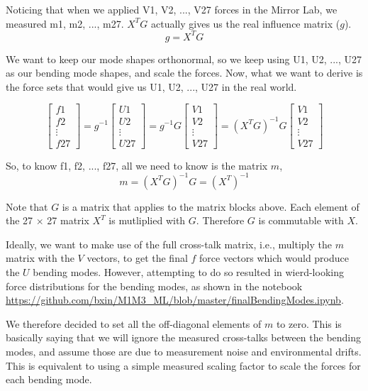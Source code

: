 \documentclass [twoside,openbib,12pt]{article}
\newcommand{\beq}{\begin{equation}}
\newcommand{\eeq}{\end{equation}}
\begin{document}
Noticing that when we applied V1, V2, ..., V27 forces in the Mirror Lab, we measured m1, m2, ..., m27. $X^T G$ actually gives us the real influence matrix ($g$).
\beq
g = X^T G
\eeq

We want to keep our mode shapes orthonormal, so we keep
using U1, U2, ..., U27 as our bending mode shapes,
and scale the forces.
Now, what we want to derive is the force sets that would give us U1, U2, ..., U27 in the real world.

\beq
\left[ \begin{array}{c} f1  \\ f2 \\ \vdots \\ f27 \end{array} \right]
= g^{-1}
\left[ \begin{array}{c} U1  \\ U2 \\ \vdots \\ U27 \end{array} \right]
= g^{-1} G
\left[ \begin{array}{c} V1  \\ V2 \\ \vdots \\ V27 \end{array} \right]
= (X^T G)^{-1} G
\left[ \begin{array}{c} V1  \\ V2 \\ \vdots \\ V27 \end{array} \right]
\eeq

So, to know f1, f2, ..., f27, all we need to know is the matrix $m$,
\beq
m = (X^T G)^{-1} G = (X^T)^{-1} 
\eeq

Note that $G$ is a matrix that applies to the matrix blocks
above. Each element of the 27 $\times$ 27 matrix $X^T$ is mutliplied with
$G$. Therefore $G$ is commutable with $X$.

Ideally, we want to make use of the full cross-talk matrix, i.e.,
multiply the $m$ matrix with the $V$ vectors, to get the final $f$
force vectors which would produce the $U$ bending modes.
However, attempting to do so resulted in wierd-looking force
distributions for the bending modes, as shown in the notebook
\url{https://github.com/bxin/M1M3_ML/blob/master/finalBendingModes.ipynb}.

We therefore decided to set all the off-diagonal elements of $m$ to
zero. This is basically saying that we will ignore the measured
cross-talks between the bending modes, and assume those are due to
measurement noise and environmental drifts.
This is equivalent to using a simple measured scaling factor to scale
the forces for each bending mode.
\end{document}
